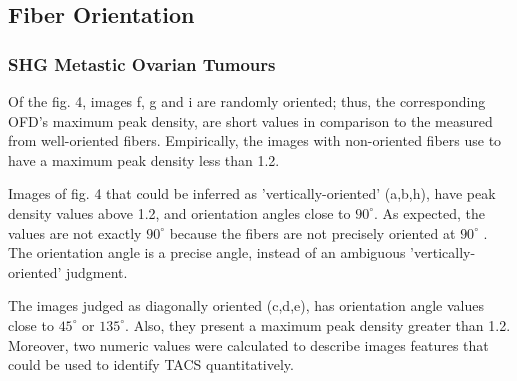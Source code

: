 \documentclass[12pt,a4paper]{article}
\begin{document}
\subsection{Fiber Orientation}
\subsubsection{SHG Metastic Ovarian Tumours}

Of the fig. 4, images f, g and i are randomly oriented; thus, the corresponding OFD's maximum peak density, are short values in comparison to the measured from well-oriented fibers. Empirically, the images with non-oriented fibers use to have a maximum peak density less than 1.2. 

Images of fig. 4 that could be inferred as 'vertically-oriented' (a,b,h), have peak density values above 1.2, and orientation angles close to $90^{\circ}$. As expected, the values are not exactly  $90^{\circ}$  because the fibers are not precisely oriented at  $90^{\circ}$ . The orientation angle is a precise angle, instead of an ambiguous 'vertically-oriented' judgment.  

The images judged as diagonally oriented (c,d,e), has orientation angle values close to  $45^{\circ}$ or  $135^{\circ}$. Also, they present a maximum peak density greater than 1.2. Moreover, two numeric values were calculated to describe images features that could be used to identify TACS quantitatively.
\end{document}
